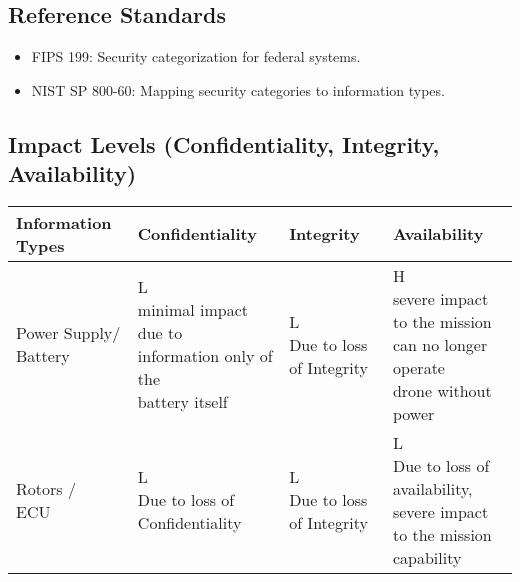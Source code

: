 \documentclass{article}
\begin{document}
\subsection{Reference Standards}
\begin{itemize}
    \item FIPS 199: Security categorization for federal systems.
    \item NIST SP 800-60: Mapping security categories to information types.
\end{itemize}

\subsection{Impact Levels (Confidentiality, Integrity, Availability)}

\begin{center}
    \begin{tabular}{|p{3cm}|p{3.5cm}|p{3.5cm}|p{3.5cm}|}
    \hline
    \rowcolor{navyblue!80}
    \color{white}\textbf{Information Types} & 
    \color{white}\textbf{Confidentiality} & 
    \color{white}\textbf{Integrity} & 
    \color{white}\textbf{Availability} \\ \hline
    
    \makecell{Power Supply/\\Battery} & 
    \makecell[l]{L\\ \scriptsize minimal impact due to 
    \\\scriptsize information only of the 
    \\\scriptsize battery itself } & 
    \makecell[l]{L\\ \scriptsize Due to loss of Integrity }& 
    \makecell[l]{H\\ \scriptsize severe impact to the mission 
    \\\scriptsize can no longer operate
    \\\scriptsize drone without power} \\ \hline
    
    \makecell{Rotors /\\ ECU} & 
    \makecell[l]{L
    \\ \scriptsize Due to loss of Confidentiality} & 
    \makecell[l]{L
    \\ \scriptsize Due to loss of Integrity }& 
    \makecell[l]{L
    \\ \scriptsize Due to loss of availability,\\
    \scriptsize severe impact to the mission 
    \\\scriptsize capability} \\ \hline


\end{tabular}
\end{center}
\end{document}
